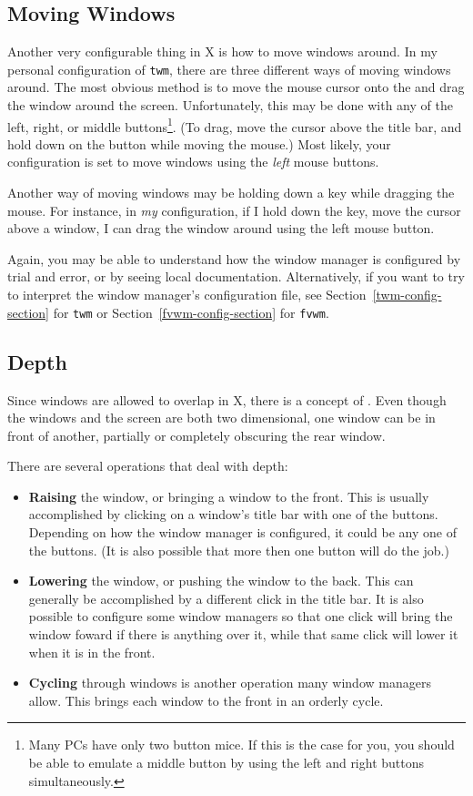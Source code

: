 \subsection{Moving Windows}

Another very configurable thing in X is how to move windows around.
In my personal configuration of {\tt twm}, there are three different
ways of moving windows around.  The most obvious method is to move the
mouse cursor onto the  and drag the window around
the screen. Unfortunately, this may be done with any of the left,
right, or middle buttons\footnote{Many PCs have only two button mice.
  If this is the case for you, you should be able to emulate a middle
  button by using the left and right buttons simultaneously.}. (To
drag, move the cursor above the title bar, and hold down on the button
while moving the mouse.)  Most likely, your configuration is
set to move windows using the \emph{left} mouse buttons.

Another way of moving windows may be holding down a key while dragging
the mouse. For instance, in {\em my\/} configuration, if I hold down
the  key, move the cursor above a window, I can drag the
window around using the left mouse button.

Again, you may be able to understand how the window manager is
configured by trial and error, or by seeing local
documentation. Alternatively, if you want to try to interpret the
window manager's configuration file, see
Section~\ref{twm-config-section} for {\tt twm} or
Section~\ref{fvwm-config-section} for {\tt fvwm}.

\subsection{Depth}

Since windows are allowed to overlap in X, there is a concept of
.  Even though the windows and the screen are both two
dimensional, one window can be in front of another, partially or
completely obscuring the rear window.

There are several operations that deal with depth:
\begin{itemize}
\item {\bf Raising} the window, or bringing a window to the front.
  This is usually accomplished by clicking on a window's title bar
  with one of the buttons.  Depending on how the window manager is
  configured, it could be any one of the buttons. (It is also possible
  that more then one button will do the job.)

\item {\bf Lowering} the window, or pushing the window to the back.
  This can generally be accomplished by a different click in the title
  bar. It is also possible to configure some window managers so that
  one click will bring the window foward if there is anything over it,
  while that same click will lower it when it is in the front.

\item {\bf Cycling} through windows is another operation many window
  managers allow. This brings each window to the front in an orderly
  cycle.  
\end{itemize}

